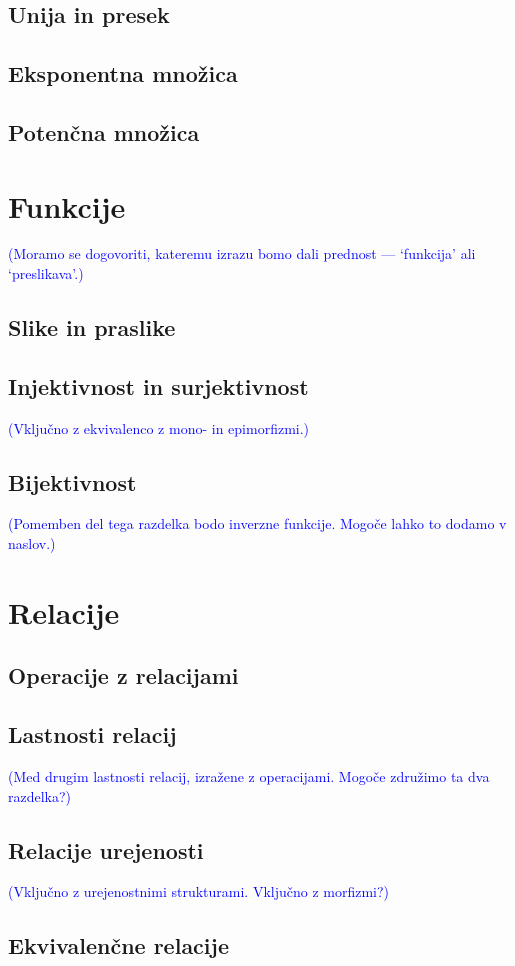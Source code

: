 \documentclass[11pt,a4paper,twoside]{book}
\newcommand{\note}[1]{{\small\textcolor{blue}{(#1)}}}
\begin{document}
		\section{Unija in presek}
		\section{Eksponentna množica}
		\section{Potenčna množica}
	
	\chapter{Funkcije}
		\note{Moramo se dogovoriti, kateremu izrazu bomo dali prednost --- `funkcija' ali `preslikava'.}
		\section{Slike in praslike}
		\section{Injektivnost in surjektivnost}
			\note{Vključno z ekvivalenco z mono- in epimorfizmi.}
		\section{Bijektivnost}
			\note{Pomemben del tega razdelka bodo inverzne funkcije. Mogoče lahko to dodamo v naslov.}
	
	\chapter{Relacije}
		\section{Operacije z relacijami}
		\section{Lastnosti relacij}
			\note{Med drugim lastnosti relacij, izražene z operacijami. Mogoče združimo ta dva razdelka?}
		\section{Relacije urejenosti}
			\note{Vključno z urejenostnimi strukturami. Vključno z morfizmi?}
		\section{Ekvivalenčne relacije}
\end{document}
